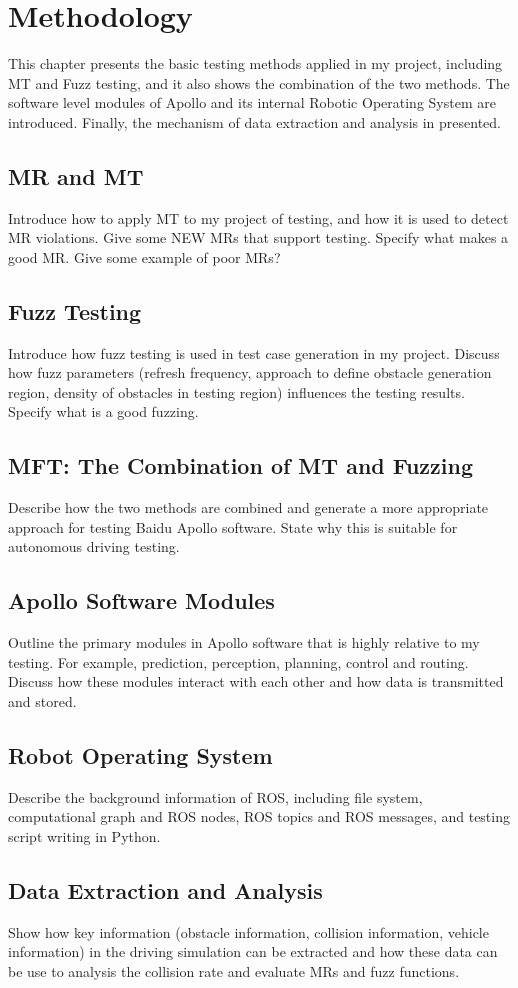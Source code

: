 \chapter{Methodology}
\label{ch:method}

This chapter presents the basic testing methods applied in my project, including MT and Fuzz testing, and it also shows the combination of the two methods. The software level modules of Apollo and its internal Robotic Operating System are introduced. Finally, the mechanism of data extraction and analysis in presented.
 
\section{MR and MT}
Introduce how to apply MT to my project of testing, and how it is used to detect MR violations. Give some NEW MRs that support testing. Specify what makes a good MR. Give some example of poor MRs?

\section{Fuzz Testing}
Introduce how fuzz testing is used in test case generation in my project. Discuss how fuzz parameters (refresh frequency, approach to define obstacle generation region, density of obstacles in testing region) influences the testing results. Specify what is a good fuzzing. 

\section{MFT: The Combination of MT and Fuzzing}
Describe how the two methods are combined and generate a more appropriate approach for testing Baidu Apollo software. State why this is suitable for autonomous driving testing. 

\section{Apollo Software Modules}
Outline the primary modules in Apollo software that is highly relative to my testing. For example, prediction, perception, planning, control and routing. Discuss how these modules interact with each other and how data is transmitted and stored.

\section{Robot Operating System}
Describe the background information of ROS, including file system, computational graph and ROS nodes, ROS topics and ROS messages, and testing script writing in Python.

\section{Data Extraction and Analysis}
Show how key information (obstacle information, collision information, vehicle information) in the driving simulation can be extracted and how these data can be use to analysis the collision rate and evaluate MRs and fuzz functions.